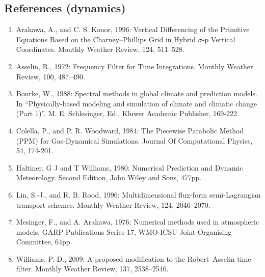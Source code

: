 \hypertarget{references-dynamics}{%
\subsection{References (dynamics)}\label{references-dynamics}}

\begin{enumerate}
\def\labelenumi{\arabic{enumi}.}
\item
  Arakawa, A., and C. S. Konor, 1996: Vertical Differencing of the
  Primitive Equations Based on the Charney--Phillips Grid in Hybrid
  $\sigma$-p Vertical Coordinates. Monthly Weather Review, 124,
  511--528.
\item
  Asselin, R., 1972: Frequency Filter for Time Integrations. Monthly
  Weather Review, 100, 487--490.
\item
  Bourke, W., 1988: Spectral methods in global climate and prediction
  models. In ``Physically-based modeling and simulation of climate and
  climatic change (Part 1)''. M. E. Schlesinger, Ed., Kluwer Academic
  Publisher, 169-222.
\item
  Colella, P., and P. R. Woodward, 1984: The Piecewise Parabolic Method
  (PPM) for Gas-Dynamical Simulations. Journal Of Computational Physics,
  54, 174-201.
\item
  Haltiner, G J and T Williams, 1980: Numerical Prediction and Dynamic
  Meteorology. Second Edition, John Wiley and Sons, 477pp.
\item
  Lin, S.-J., and R. B. Rood, 1996: Multidimensional flux-form
  semi-Lagrangian transport schemes. Monthly Weather Review, 124,
  2046--2070.
\item
  Mesinger, F., and A. Arakawa, 1976: Numerical methods used in
  atmospheric models, GARP Publications Series 17, WMO-ICSU Joint
  Organising Committee, 64pp.
\item
  Williams, P. D., 2009: A proposed modification to the Robert--Asselin
  time filter. Monthly Weather Review, 137, 2538--2546.
\end{enumerate}

